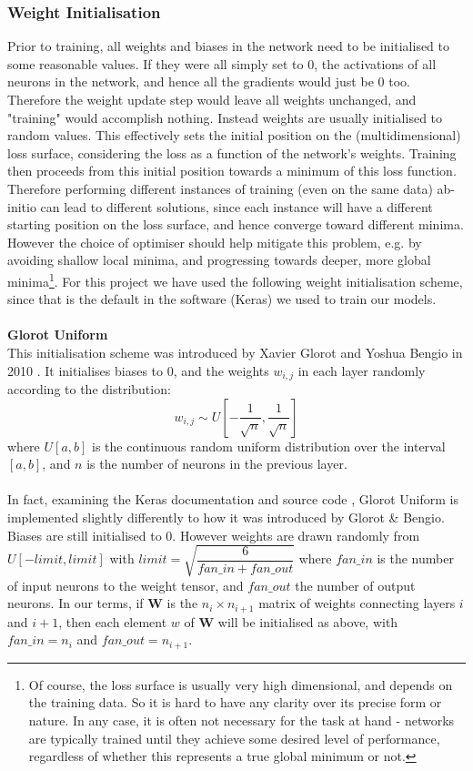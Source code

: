 \documentclass[11pt]{article} %
\theoremstyle{plain}
\theoremstyle{definition}
\begin{document}
\subsubsection{Weight Initialisation}
Prior to training, all weights and biases in the network need to be initialised to some reasonable values. If they were all simply set to 0, the activations of all neurons in the network, and hence all the gradients would just be 0 too. Therefore the weight update step would leave all weights unchanged, and "training" would accomplish nothing. Instead weights are usually initialised to random values. This effectively sets the initial position on the (multidimensional) loss surface, considering the loss as a function of the network's weights. Training then proceeds from this initial position towards a minimum of this loss function. Therefore performing different instances of training (even on the same data) ab-initio can lead to different solutions, since each instance will have a different starting position on the loss surface, and hence converge toward different minima. However the choice of optimiser should help mitigate this problem, e.g. by avoiding shallow local minima, and progressing towards deeper, more global minima\footnote{Of course, the loss surface is usually very high dimensional, and depends on the training data. So it is hard to have any clarity over its precise form or nature. In any case, it is often not necessary for the task at hand - networks are typically trained until they achieve some desired level of performance, regardless of whether this represents a true global minimum or not.}. For this project we have used the following weight initialisation scheme, since that is the default in the software (Keras) we used to train our models.
\\
\\
\noindent
\textbf{Glorot Uniform}
\\
\noindent
This initialisation scheme was introduced by Xavier Glorot and Yoshua Bengio in 2010 \cite{glorot_uniform}. It initialises biases to 0, and the weights \(w_{i,j}\) in each layer randomly according to the distribution:
\[ w_{i,j} \sim U[-\dfrac{1}{\sqrt{n}}, \dfrac{1}{\sqrt{n}}] \]
where \(U[a,b]\) is the continuous random uniform distribution over the interval \([a,b]\), and \(n\) is the number of neurons in the previous layer.
\\
\\
\noindent
In fact, examining the Keras documentation and source code \cite{keras_source_glorot_uniform}, Glorot Uniform is implemented slightly differently to how it was introduced by Glorot \& Bengio. Biases are still initialised to 0. However weights are drawn randomly from \(U[-limit,limit]\) with \(limit = \sqrt{\dfrac{6}{fan\_in + fan\_out}}\) where \(fan\_in\) is the number of input neurons to the weight tensor, and \(fan\_out\) the number of output neurons. In our terms, if \(\mathbf{W}\) is the \(n_i \times n_{i+1}\) matrix of weights connecting layers \(i\) and \(i+1\), then each element \(w\) of \(\mathbf{W}\) will be initialised as above, with \(fan\_in = n_i\) and \(fan\_out = n_{i+1}\).  
\end{document}
